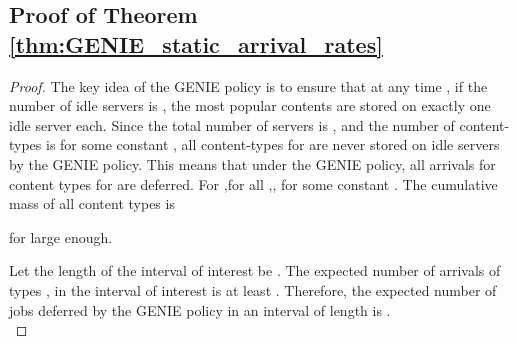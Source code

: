 \documentclass[10pt, conference, letterpaper]{IEEEtran}
\begin{document}
\subsection{Proof of Theorem \ref{thm:GENIE_static_arrival_rates}}
\begin{proof}
	The key idea of the GENIE policy is to ensure that at any time , if the number of idle servers is , the  most popular contents are stored on exactly one idle server each. Since the total number of servers is , and the number of content-types is  for some constant , all content-types  for  are never stored on idle servers by the GENIE policy. This means that under the GENIE policy, all arrivals for content types  for  are deferred. For ,for all ,, for some constant .
	The cumulative mass of all content types  is
	
	for  large enough.
	
	Let the length of the interval of interest be . The expected number of arrivals of types , in the interval of interest is at least . Therefore, the expected number of jobs deferred by the GENIE policy in an interval of length  is .\\
\end{proof}
\end{document}
